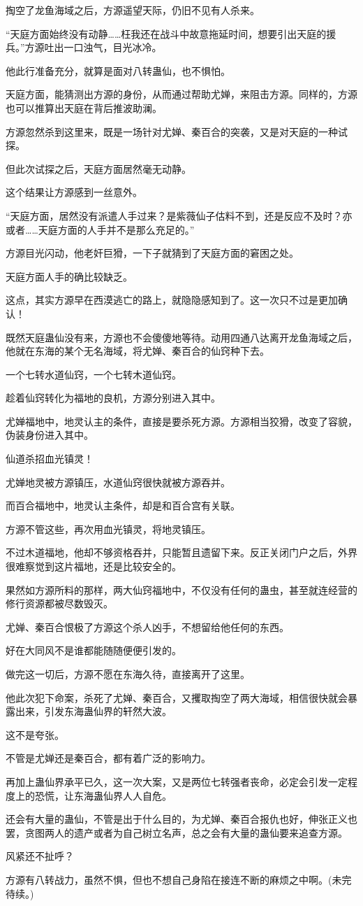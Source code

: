 \begin{this_body}
掏空了龙鱼海域之后，方源遥望天际，仍旧不见有人杀来。

“天庭方面始终没有动静……枉我还在战斗中故意拖延时间，想要引出天庭的援兵。”方源吐出一口浊气，目光冰冷。

他此行准备充分，就算是面对八转蛊仙，也不惧怕。

天庭方面，能猜测出方源的身份，从而通过帮助尤婵，来阻击方源。同样的，方源也可以推算出天庭在背后推波助澜。

方源忽然杀到这里来，既是一场针对尤婵、秦百合的突袭，又是对天庭的一种试探。

但此次试探之后，天庭方面居然毫无动静。

这个结果让方源感到一丝意外。

“天庭方面，居然没有派遣人手过来？是紫薇仙子估料不到，还是反应不及时？亦或者……天庭方面的人手并不是那么充足的。”

方源目光闪动，他老奸巨猾，一下子就猜到了天庭方面的窘困之处。

天庭方面人手的确比较缺乏。

这点，其实方源早在西漠逃亡的路上，就隐隐感知到了。这一次只不过是更加确认！

既然天庭蛊仙没有来，方源也不会傻傻地等待。动用四通八达离开龙鱼海域之后，他就在东海的某个无名海域，将尤婵、秦百合的仙窍种下去。

一个七转水道仙窍，一个七转木道仙窍。

趁着仙窍转化为福地的良机，方源分别进入其中。

尤婵福地中，地灵认主的条件，直接是要杀死方源。方源相当狡猾，改变了容貌，伪装身份进入其中。

仙道杀招血光镇灵！

尤婵地灵被方源镇压，水道仙窍很快就被方源吞并。

而百合福地中，地灵认主条件，却是和百合宫有关联。

方源不管这些，再次用血光镇灵，将地灵镇压。

不过木道福地，他却不够资格吞并，只能暂且遗留下来。反正关闭门户之后，外界很难察觉到这片福地，还是比较安全的。

果然如方源所料的那样，两大仙窍福地中，不仅没有任何的蛊虫，甚至就连经营的修行资源都被尽数毁灭。

尤婵、秦百合恨极了方源这个杀人凶手，不想留给他任何的东西。

好在大同风不是谁都能随随便便引发的。

做完这一切后，方源不愿在东海久待，直接离开了这里。

他此次犯下命案，杀死了尤婵、秦百合，又攫取掏空了两大海域，相信很快就会暴露出来，引发东海蛊仙界的轩然大波。

这不是夸张。

不管是尤婵还是秦百合，都有着广泛的影响力。

再加上蛊仙界承平已久，这一次大案，又是两位七转强者丧命，必定会引发一定程度上的恐慌，让东海蛊仙界人人自危。

还会有大量的蛊仙，不管是出于什么目的，为尤婵、秦百合报仇也好，伸张正义也罢，贪图两人的遗产或者为自己树立名声，总之会有大量的蛊仙要来追查方源。

风紧还不扯呼？

方源有八转战力，虽然不惧，但也不想自己身陷在接连不断的麻烦之中啊。(未完待续。)

\end{this_body}

